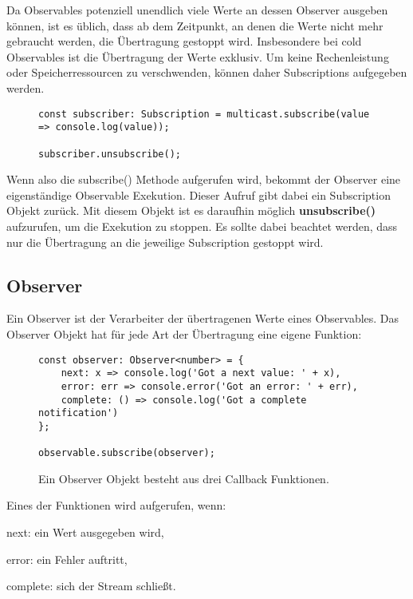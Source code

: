 Da Observables potenziell unendlich viele Werte an dessen Observer ausgeben können, ist es üblich, dass ab dem Zeitpunkt, an denen die Werte nicht mehr gebraucht werden, die Übertragung gestoppt wird. Insbesondere bei cold Observables ist die Übertragung der Werte exklusiv. Um keine Rechenleistung oder Speicherressourcen zu verschwenden, können daher Subscriptions aufgegeben werden.

\begin{figure}[H]
\begin{lstlisting}[basicstyle=\small]
const subscriber: Subscription = multicast.subscribe(value => console.log(value));

subscriber.unsubscribe();
\end{lstlisting}
\end{figure}

\noindent
Wenn also die subscribe() Methode aufgerufen wird, bekommt der Observer eine eigenständige Observable Exekution. Dieser Aufruf gibt dabei ein Subscription Objekt zurück. Mit diesem Objekt ist es daraufhin möglich \textbf{unsubscribe()} aufzurufen, um die Exekution zu stoppen. Es sollte dabei beachtet werden, dass nur die Übertragung an die jeweilige Subscription gestoppt wird.

\subsection{Observer}

Ein Observer ist der Verarbeiter der übertragenen Werte eines Observables. Das Observer Objekt hat für jede Art der Übertragung eine eigene Funktion:

\begin{figure}[H]
\begin{lstlisting}[basicstyle=\small]
const observer: Observer<number> = {
    next: x => console.log('Got a next value: ' + x),
    error: err => console.error('Got an error: ' + err),
    complete: () => console.log('Got a complete notification')
};

observable.subscribe(observer);
\end{lstlisting}
\caption{Ein Observer Objekt besteht aus drei Callback Funktionen.}
\end{figure}

\noindent
Eines der Funktionen wird aufgerufen, wenn:

\begin{description}
\item next: ein Wert ausgegeben wird,
\item error: ein Fehler auftritt,
\item complete: sich der Stream schließt.
\end{description}

